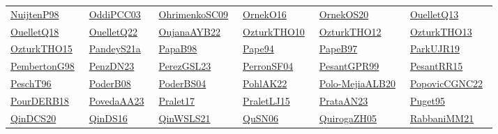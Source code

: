 \begin{longtable}{*{6}{l}}
\href{../works/NuijtenP98.pdf}{NuijtenP98}~\cite{NuijtenP98} & \href{../works/OddiPCC03.pdf}{OddiPCC03}~\cite{OddiPCC03} & \href{../works/OhrimenkoSC09.pdf}{OhrimenkoSC09}~\cite{OhrimenkoSC09} & \href{../works/OrnekO16.pdf}{OrnekO16}~\cite{OrnekO16} & \href{../works/OrnekOS20.pdf}{OrnekOS20}~\cite{OrnekOS20} & \href{../works/OuelletQ13.pdf}{OuelletQ13}~\cite{OuelletQ13}\\ 
\href{../works/OuelletQ18.pdf}{OuelletQ18}~\cite{OuelletQ18} & \href{../works/OuelletQ22.pdf}{OuelletQ22}~\cite{OuelletQ22} & \href{../works/OujanaAYB22.pdf}{OujanaAYB22}~\cite{OujanaAYB22} & \href{../works/OzturkTHO10.pdf}{OzturkTHO10}~\cite{OzturkTHO10} & \href{../works/OzturkTHO12.pdf}{OzturkTHO12}~\cite{OzturkTHO12} & \href{../works/OzturkTHO13.pdf}{OzturkTHO13}~\cite{OzturkTHO13}\\ 
\href{../works/OzturkTHO15.pdf}{OzturkTHO15}~\cite{OzturkTHO15} & \href{../works/PandeyS21a.pdf}{PandeyS21a}~\cite{PandeyS21a} & \href{../works/PapaB98.pdf}{PapaB98}~\cite{PapaB98} & \href{../works/Pape94.pdf}{Pape94}~\cite{Pape94} & \href{../}{PapeB97}~\cite{PapeB97} & \href{../works/ParkUJR19.pdf}{ParkUJR19}~\cite{ParkUJR19}\\ 
\href{../works/PembertonG98.pdf}{PembertonG98}~\cite{PembertonG98} & \href{../works/PenzDN23.pdf}{PenzDN23}~\cite{PenzDN23} & \href{../works/PerezGSL23.pdf}{PerezGSL23}~\cite{PerezGSL23} & \href{../works/PerronSF04.pdf}{PerronSF04}~\cite{PerronSF04} & \href{../}{PesantGPR99}~\cite{PesantGPR99} & \href{../works/PesantRR15.pdf}{PesantRR15}~\cite{PesantRR15}\\ 
\href{../}{PeschT96}~\cite{PeschT96} & \href{../works/PoderB08.pdf}{PoderB08}~\cite{PoderB08} & \href{../works/PoderBS04.pdf}{PoderBS04}~\cite{PoderBS04} & \href{../works/PohlAK22.pdf}{PohlAK22}~\cite{PohlAK22} & \href{../works/Polo-MejiaALB20.pdf}{Polo-MejiaALB20}~\cite{Polo-MejiaALB20} & \href{../works/PopovicCGNC22.pdf}{PopovicCGNC22}~\cite{PopovicCGNC22}\\ 
\href{../works/PourDERB18.pdf}{PourDERB18}~\cite{PourDERB18} & \href{../works/PovedaAA23.pdf}{PovedaAA23}~\cite{PovedaAA23} & \href{../works/Pralet17.pdf}{Pralet17}~\cite{Pralet17} & \href{../works/PraletLJ15.pdf}{PraletLJ15}~\cite{PraletLJ15} & \href{../works/PrataAN23.pdf}{PrataAN23}~\cite{PrataAN23} & \href{../works/Puget95.pdf}{Puget95}~\cite{Puget95}\\ 
\href{../works/QinDCS20.pdf}{QinDCS20}~\cite{QinDCS20} & \href{../}{QinDS16}~\cite{QinDS16} & \href{../works/QinWSLS21.pdf}{QinWSLS21}~\cite{QinWSLS21} & \href{../works/QuSN06.pdf}{QuSN06}~\cite{QuSN06} & \href{../works/QuirogaZH05.pdf}{QuirogaZH05}~\cite{QuirogaZH05} & \href{../}{RabbaniMM21}~\cite{RabbaniMM21}\\ 

\end{longtable}
